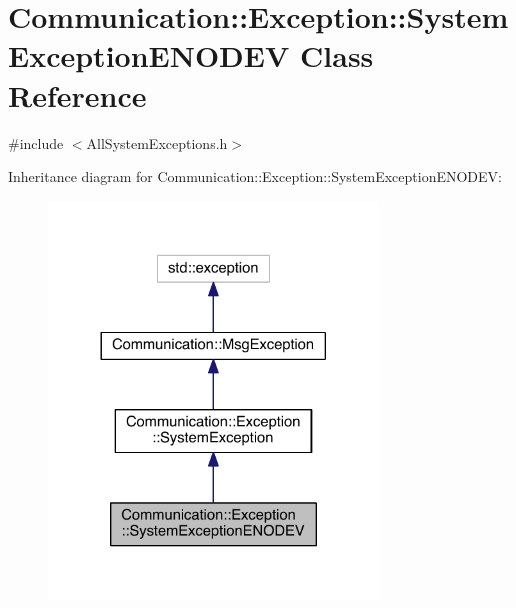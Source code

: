 \hypertarget{class_communication_1_1_exception_1_1_system_exception_e_n_o_d_e_v}{}\section{Communication\+:\+:Exception\+:\+:System\+Exception\+E\+N\+O\+D\+E\+V Class Reference}
\label{class_communication_1_1_exception_1_1_system_exception_e_n_o_d_e_v}


{\ttfamily \#include $<$All\+System\+Exceptions.\+h$>$}



Inheritance diagram for Communication\+:\+:Exception\+:\+:System\+Exception\+E\+N\+O\+D\+E\+V\+:\nopagebreak
\begin{figure}[H]
\begin{center}
\leavevmode
\includegraphics[width=248pt]{class_communication_1_1_exception_1_1_system_exception_e_n_o_d_e_v__inherit__graph}
\end{center}
\end{figure}


